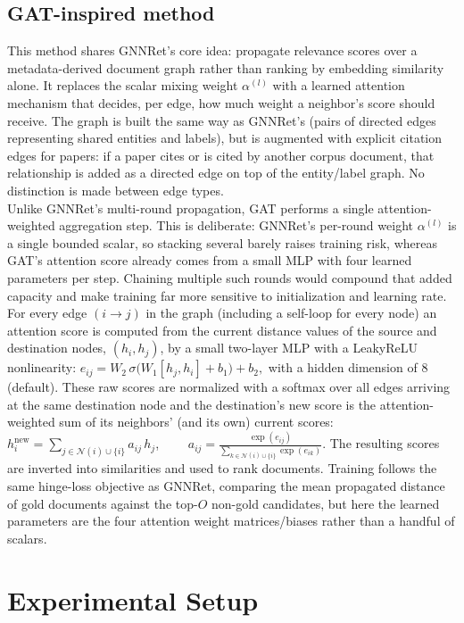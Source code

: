 \documentclass[11pt]{article}
\begin{document}
\subsection{GAT-inspired method}
\label{subsec:GAT}
This method shares GNNRet's core idea: propagate relevance scores over a metadata-derived document graph rather than ranking by embedding similarity alone. It replaces the scalar mixing weight $\alpha^{(l)}$ with a learned attention mechanism that decides, per edge, how much weight a neighbor's score should receive. The graph is built the same way as GNNRet's (pairs of directed edges representing shared entities and labels), but is augmented with explicit citation edges for papers: if a paper cites or is cited by another corpus document, that relationship is added as a directed edge on top of the entity/label graph. No distinction is made between edge types.\\
Unlike GNNRet's multi-round propagation, GAT performs a single attention-weighted aggregation step. This is deliberate: GNNRet's per-round weight $\alpha^{(l)}$ is a single bounded scalar, so stacking several barely raises training risk, whereas GAT's attention score already comes from a small MLP with four learned parameters per step. Chaining multiple such rounds would compound that added capacity and make training far more sensitive to initialization and learning rate.\\
For every edge $(i \to j)$ in the graph (including a self-loop for every node) an attention score is computed from the current distance values of the source and destination nodes, $(h_i, h_j)$, by a small two-layer MLP with a LeakyReLU nonlinearity:
\(
e_{ij} = W_2\, \sigma\bigl(W_1 [h_j, h_i] + b_1\bigr) + b_2,
\)
with a hidden dimension of 8 (default). These raw scores are normalized with a softmax over all edges arriving at the same destination node and the destination's new score is the attention-weighted sum of its neighbors' (and its own) current scores:
\(
h_i^{\text{new}} = \sum_{j \in \mathcal{N}(i) \cup \{i\}} a_{ij}\, h_j\), 
\(
\qquad a_{ij} = \frac{\exp(e_{ij})}{\sum_{k \in \mathcal{N}(i)\cup\{i\}} \exp(e_{ik})}.
\)
The resulting scores are inverted into similarities and used to rank documents. Training follows the same hinge-loss objective as GNNRet, comparing the mean propagated distance of gold documents against the top-$O$ non-gold candidates, but here the learned parameters are the four attention weight matrices/biases rather than a handful of scalars.

\section{Experimental Setup}
\end{document}
